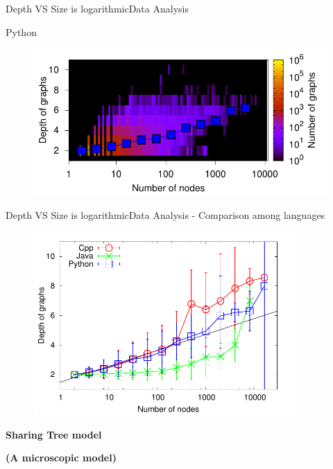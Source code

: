 \documentclass[11pt,svgnames]{beamer}
\begin{document}
\begin{frame}[noframenumbering]{Depth VS Size is logarithmic}{Data Analysis}
\begin{tcolorbox}[colframe=blue]
\center
 Python
\end{tcolorbox}
\begin{figure}[p]%
\includegraphics[width=12cm,draft=false]{immagini/mappy.pdf}
\end{figure}
\end{frame}

\begin{frame}{Depth VS Size is logarithmic}{Data Analysis - Comparison among languages}
\begin{figure}[H]%
\includegraphics[width=10cm,draft=false]{immagini/depVSNnodes_err.pdf}
\end{figure}
\end{frame}

\begingroup
{}
\begin{frame}
\center
\textbf {\Huge {\color{white} {Sharing Tree model}}}

\vspace{0.5cm}
\textbf {\large {\color{white} {(A microscopic model)}}}
\end{frame}
\endgroup
\end{document}
